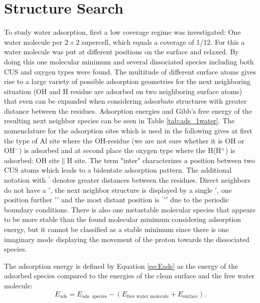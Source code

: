\documentclass[11pt,DIV=13,BCOR=5mm,a4paper,headinclude]{scrbook}
\begin{document}
\section{Structure Search}\label{structure_search11-20}
To study water adsorption, first a low coverage regime was investigated: One water molecule per $2\times 2$ supercell, which equals a coverage of 1/12.
For this a water molecule was put at different positions on the surface and relaxed.
By doing this one molecular minimum and several dissociated species including both CUS and oxygen types were found.
The multitude of different surface atoms gives rise to a large variety of possible adsorption geometries for the next neighboring situation (OH and H residue are adsorbed on two neighboring surface atoms) that even can be expanded when considering adsorbate structures with greater distance between the residues.
Adsorption energies and Gibb's free energy of the resulting next neighbor species can be seen in Table \ref{tab:ads_1water}.
The nomenclature for the adsorption sites which is used in the following gives at first the type of Al site where the OH-residue (we are not sure whether it is OH or OH$^-$) is adsorbed and at second place the oxygen type where the H(H$^+$) is adsorbed: OH site$\parallel$H site.
The term "inter" characterizes a position between two CUS atoms which leads to a bidentate adsorption pattern.
The additional notation with $^\prime$ denotes greater distances between the residues.
Direct neighbors do not have a $\prime$, the next neighbor structure is displayed by a single $\prime$, one position further $\prime\prime$ and the most distant position is $^\prime\prime\prime$ due to the periodic boundary conditions.
There is also one metastable molecular species that appears to be more stable than the found molecular minimum considering adsorption energy, but it cannot be classified as a stable minimum since there is one imaginary mode displaying the movement of the proton towards the dissociated species.


The adsorption energy is defined by Equation \ref{eq:Eads} as the energy of the adsorbed species compared to the energies of the clean surface and the free water molecule:
\begin{equation}\label{eq:Eads}
 E_\textrm{ads}=E_\text{ads. species}-(E_\text{free water molecule}+E_\text{surface}).
\end{equation}
\end{document}
